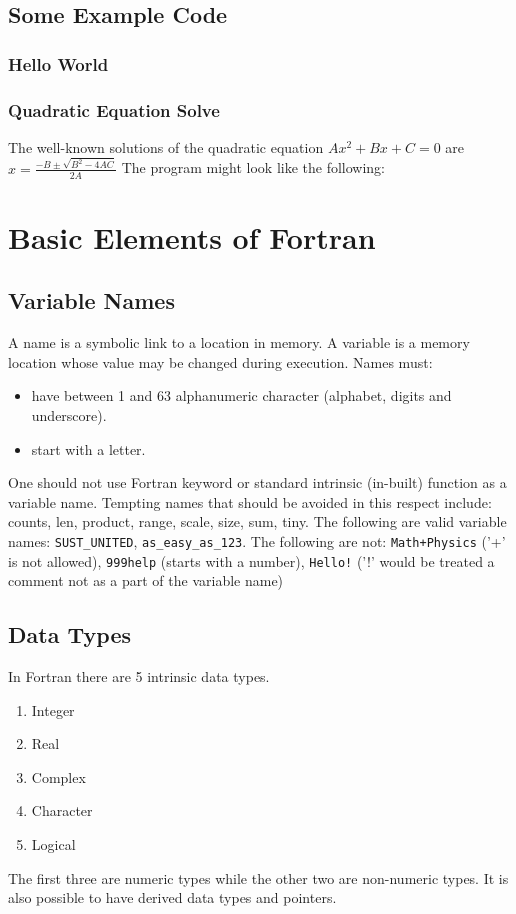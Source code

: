\documentclass[12pt,oneside]{book}
\newcommand{\code}[1]{\lstinline[keywordstyle=\color{black},basicstyle=\ttfamily]{#1}}
\begin{document}
    \section{Some Example Code}
    \subsection{Hello World}
    
    \subsection{Quadratic Equation Solve}
    The well-known solutions of the quadratic equation $ Ax^2+Bx+C=0 $ are $ x=\frac{\displaystyle-B\pm\sqrt{ B^2-4AC}}{\displaystyle 2A} $
    The program might look like the following:
    
    \chapter{Basic Elements of Fortran}
    \section{Variable Names}
    A name is a symbolic link to a location in memory. A variable is a memory location whose value may be changed during execution.
    Names must:
    \begin{itemize}
        \item have between 1 and 63 alphanumeric character (alphabet, digits and underscore).
        \item start with a letter.
    \end{itemize}
    One should not use Fortran keyword or standard intrinsic (in-built) function as a variable name.
    Tempting names that should be avoided in this respect include: counts, len, product, range, scale, size, sum, tiny.
    The following are valid variable names: \code{SUST_UNITED}, \code{as_easy_as_123}.
    The following are not: \code{Math+Physics} ('+' is not allowed), \code{999help} (starts with a number), \code{Hello!} ('!' would be treated a comment not as a part of the variable name)
    \section{Data Types}
    In Fortran there are 5 intrinsic data types.
    \begin{enumerate}
        \item Integer
        \item Real 
        \item Complex
        \item Character
        \item Logical
    \end{enumerate}
    The first three are numeric types while the other two are non-numeric types. 
    It is also possible to have derived data types and pointers.
\end{document}
